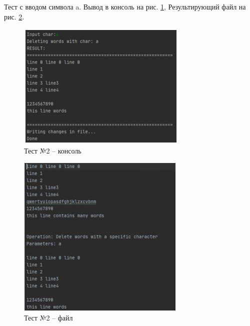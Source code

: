 \newpage

Тест с вводом символа a. Вывод в консоль на рис. \ref{test.2.console}, Результирующий
файл на рис. \ref{test.2.file}.

\begin{figure}[H]
	\centering
	\includegraphics[width=0.6\linewidth]{photo/test.2.console}
	\caption{Тест №2 -- консоль}
	\label{test.2.console}
\end{figure}

\begin{figure}[H]
	\centering
	\includegraphics[width=0.6\linewidth]{photo/test.2.file}
	\caption{Тест №2 -- файл}
	\label{test.2.file}
\end{figure}

